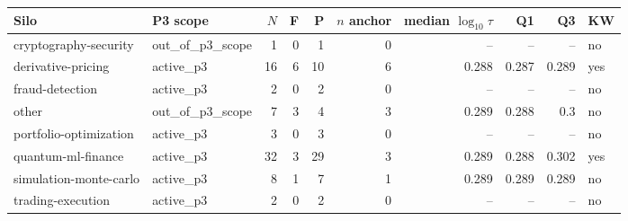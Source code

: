 \begin{tabular}{llrrrrrrrl}
\toprule
Silo & P3 scope & $N$ & F & P & $n$ anchor & median $\log_{10}\tau$ & Q1 & Q3 & KW \\
\midrule
cryptography-security & out\_of\_p3\_scope & 1 & 0 & 1 & 0 & -- & -- & -- & no \\
derivative-pricing & active\_p3 & 16 & 6 & 10 & 6 & 0.288 & 0.287 & 0.289 & yes \\
fraud-detection & active\_p3 & 2 & 0 & 2 & 0 & -- & -- & -- & no \\
other & out\_of\_p3\_scope & 7 & 3 & 4 & 3 & 0.289 & 0.288 & 0.3 & no \\
portfolio-optimization & active\_p3 & 3 & 0 & 3 & 0 & -- & -- & -- & no \\
quantum-ml-finance & active\_p3 & 32 & 3 & 29 & 3 & 0.289 & 0.288 & 0.302 & yes \\
simulation-monte-carlo & active\_p3 & 8 & 1 & 7 & 1 & 0.289 & 0.289 & 0.289 & no \\
trading-execution & active\_p3 & 2 & 0 & 2 & 0 & -- & -- & -- & no \\
\bottomrule
\end{tabular}
